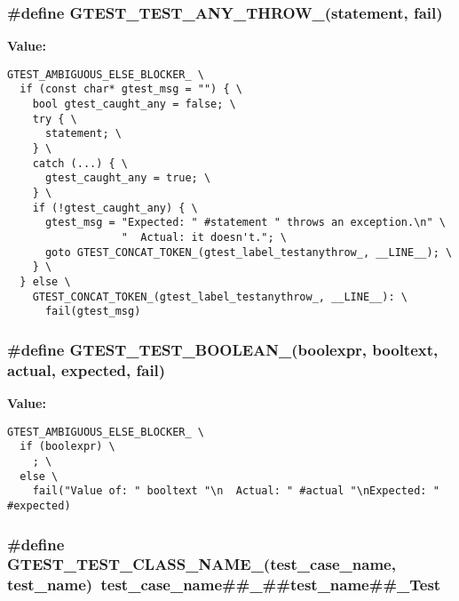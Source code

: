 \subsubsection{\setlength{\rightskip}{0pt plus 5cm}\#define GTEST\_\-TEST\_\-ANY\_\-THROW\_\-(statement, fail)}\label{gtest-internal_8h_296441eb7d4240ae2378daac84516e72}


\textbf{Value:}

\begin{Code}\begin{verbatim}GTEST_AMBIGUOUS_ELSE_BLOCKER_ \
  if (const char* gtest_msg = "") { \
    bool gtest_caught_any = false; \
    try { \
      statement; \
    } \
    catch (...) { \
      gtest_caught_any = true; \
    } \
    if (!gtest_caught_any) { \
      gtest_msg = "Expected: " #statement " throws an exception.\n" \
                  "  Actual: it doesn't."; \
      goto GTEST_CONCAT_TOKEN_(gtest_label_testanythrow_, __LINE__); \
    } \
  } else \
    GTEST_CONCAT_TOKEN_(gtest_label_testanythrow_, __LINE__): \
      fail(gtest_msg)
\end{verbatim}
\end{Code}
\subsubsection{\setlength{\rightskip}{0pt plus 5cm}\#define GTEST\_\-TEST\_\-BOOLEAN\_\-(boolexpr, booltext, actual, expected, fail)}\label{gtest-internal_8h_7953c0920da3a3bcf8256aa05cc49b9d}


\textbf{Value:}

\begin{Code}\begin{verbatim}GTEST_AMBIGUOUS_ELSE_BLOCKER_ \
  if (boolexpr) \
    ; \
  else \
    fail("Value of: " booltext "\n  Actual: " #actual "\nExpected: " #expected)
\end{verbatim}
\end{Code}
\subsubsection{\setlength{\rightskip}{0pt plus 5cm}\#define GTEST\_\-TEST\_\-CLASS\_\-NAME\_\-(test\_\-case\_\-name, test\_\-name)~test\_\-case\_\-name\#\#\_\-\#\#test\_\-name\#\#\_\-Test}\label{gtest-internal_8h_746d78de91616e1beb42c02d7bfaf8c6}


